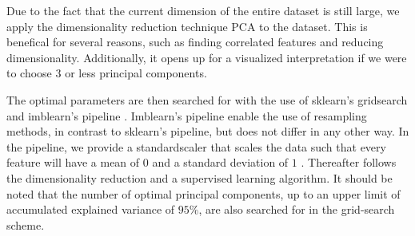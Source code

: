 

\noindent Due to the fact that the current dimension of the entire dataset is still large, we apply the dimensionality reduction technique PCA to the dataset. This is benefical for several reasons, such as finding correlated features and reducing dimensionality. Additionally, it opens up for a visualized interpretation if we were to choose $3$ or less principal components.

The optimal parameters are then searched for with the use of sklearn's gridsearch and imblearn's pipeline \cite{Pedregosa2012, Lemaitre2016}. Imblearn's pipeline enable the use of resampling methods, in contrast to sklearn's pipeline, but does not differ in any other way. In the pipeline, we provide a standardscaler that scales the data such that every feature will have a mean of $0$ and a standard deviation of $1$ \cite{Pedregosa2012}. Thereafter follows the dimensionality reduction and a supervised learning algorithm. It should be noted that the number of optimal principal components, up to an upper limit of accumulated explained variance of $95\%$, are also searched for in the grid-search scheme.

